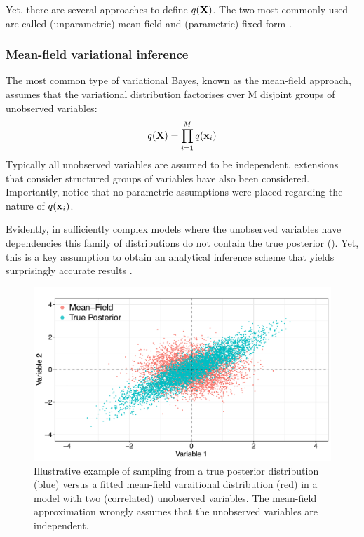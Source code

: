 Yet, there are several approaches to define $q({\bf X})$. The two most commonly used are called (unparametric) mean-field and (parametric) fixed-form \cite{Zhang2017,Blei2016}.

\subsubsection{Mean-field variational inference}  \label{section:mean_field}
The most common type of variational Bayes, known as the mean-field approach, assumes that the variational distribution factorises over M disjoint groups of unobserved variables\cite{Saul1996}:
\begin{equation} \label{eq:mean_field}
	q({\bf X}) = \prod_{i=1}^{M} q({\bf x}_i)
\end{equation}
Typically all unobserved variables are assumed to be independent, extensions that consider structured groups of variables have also been considered\cite{Barber1998,Lawrence1996,Hoffman2014}. Importantly, notice that no parametric assumptions were placed regarding the nature of $q({\bf x}_i)$.

Evidently, in sufficiently complex models where the unobserved variables have dependencies this family of distributions do not contain the true posterior (). Yet, this is a key assumption to obtain an analytical inference scheme that yields surprisingly accurate results \cite{Blei2006,Faes2011,Braun2007}.

\begin{figure}[H]
	\centering
	\includegraphics[width=0.7\linewidth]{mean_field}
	\caption{Illustrative example of sampling from a true posterior distribution (blue) versus a fitted mean-field varaitional distribution (red) in a model with two (correlated) unobserved variables. The mean-field approximation wrongly assumes that the unobserved variables are independent.}
	\label{fig:mean_field}
\end{figure}

